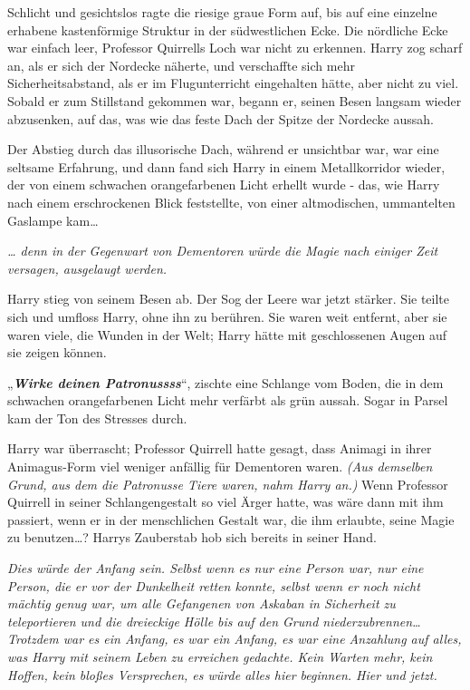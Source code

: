 {Schlicht und gesichtslos ragte die riesige graue Form auf, bis auf eine einzelne erhabene kastenförmige Struktur in der südwestlichen Ecke. Die nördliche Ecke war einfach leer, Professor Quirrells Loch war nicht zu erkennen. Harry zog scharf an, als er sich der Nordecke näherte, und verschaffte sich mehr Sicherheitsabstand, als er im Flugunterricht eingehalten hätte, aber nicht zu viel. Sobald er zum Stillstand gekommen war, begann er, seinen Besen langsam wieder abzusenken, auf das, was wie das feste Dach der Spitze der Nordecke aussah.

Der Abstieg durch das illusorische Dach, während er unsichtbar war, war eine seltsame Erfahrung, und dann fand sich Harry in einem Metallkorridor wieder, der von einem schwachen orangefarbenen Licht erhellt wurde - das, wie Harry nach einem erschrockenen Blick feststellte, von einer altmodischen, ummantelten Gaslampe kam…

\emph{… denn in der Gegenwart von Dementoren würde die Magie nach einiger Zeit versagen, ausgelaugt werden.}

Harry stieg von seinem Besen ab. Der Sog der Leere war jetzt stärker. Sie teilte sich und umfloss Harry, ohne ihn zu berühren. Sie waren weit entfernt, aber sie waren viele, die Wunden in der Welt; Harry hätte mit geschlossenen Augen auf sie zeigen können.

„\textbf{\emph{Wirke deinen Patronussss}}“, zischte eine Schlange vom Boden, die in dem schwachen orangefarbenen Licht mehr verfärbt als grün aussah. Sogar in Parsel kam der Ton des Stresses durch.

Harry war überrascht; Professor Quirrell hatte gesagt, dass Animagi in ihrer Animagus-Form viel weniger anfällig für Dementoren waren. \emph{(Aus demselben Grund, aus dem die Patronusse Tiere waren, nahm Harry an.)} Wenn Professor Quirrell in seiner Schlangengestalt so viel Ärger hatte, was wäre dann mit ihm passiert, wenn er in der menschlichen Gestalt war, die ihm erlaubte, seine Magie zu benutzen…? Harrys Zauberstab hob sich bereits in seiner Hand.

\emph{Dies würde der Anfang sein. Selbst wenn es nur eine Person war, nur eine Person, die er vor der Dunkelheit retten konnte, selbst wenn er noch nicht mächtig genug war, um alle Gefangenen von Askaban in Sicherheit zu teleportieren und die dreieckige Hölle bis auf den Grund niederzubrennen… Trotzdem war es ein Anfang,} \emph{es war ein Anfang, es war eine Anzahlung auf alles, was Harry mit seinem Leben zu erreichen gedachte. Kein Warten mehr, kein Hoffen, kein bloßes Versprechen, es würde alles hier beginnen. Hier und jetzt.}

}
